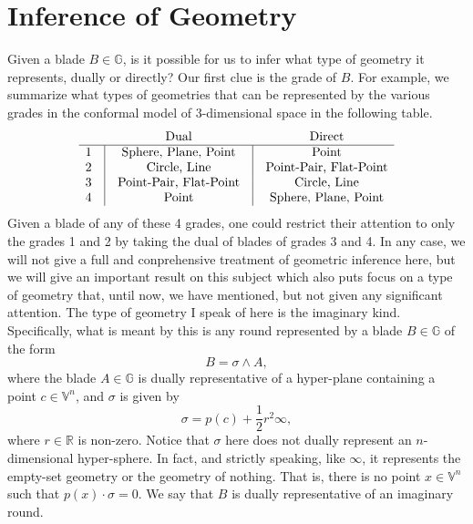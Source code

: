 \documentclass[12pt]{article}
\newcommand{\G}{\mathbb{G}}
\newcommand{\V}{\mathbb{V}}
\newcommand{\R}{\mathbb{R}}
\newcommand{\nvai}{\infty}
\begin{document}
\section{Inference of Geometry}

Given a blade $B\in\G$, is it possible for us to infer what type of geometry it
represents, dually or directly?  Our first clue is the grade of $B$.
For example, we summarize what types of geometries that can be represented by the various
grades in the conformal model of 3-dimensional space in the following table.
\begin{equation*}
\begin{array}{ccccc}
 &  & \mbox{Dual} & & \mbox{Direct} \\
\hline
1 & \vline & \mbox{Sphere, Plane, Point} & \vline & \mbox{Point} \\
2 & \vline & \mbox{Circle, Line} & \vline & \mbox{Point-Pair, Flat-Point} \\
3 & \vline & \mbox{Point-Pair, Flat-Point} & \vline & \mbox{Circle, Line} \\
4 & \vline & \mbox{Point} & \vline & \mbox{Sphere, Plane, Point}
\end{array}
\end{equation*}
Given a blade of any of these 4 grades, one could restrict their attention to
only the grades 1 and 2 by taking the dual of blades of grades 3 and 4.
In any case, we will not give a full and conprehensive treatment of
geometric inference here, but we will give an important result on this subject
which also puts focus on a type of geometry that, until now, we have
mentioned, but not given any significant attention.  
The type of geometry I speak of here is the imaginary kind.
Specifically, what is meant by this is any round represented by
a blade $B\in\G$ of the form
\begin{equation*}
B = \sigma\wedge A,
\end{equation*}
where the blade $A\in\G$ is dually representative of a hyper-plane containing
a point $c\in\V^n$, and $\sigma$ is given by
\begin{equation*}
\sigma = p(c) + \frac{1}{2}r^2\nvai,
\end{equation*}
where $r\in\R$ is non-zero.  Notice that $\sigma$ here does not dually
represent an $n$-dimensional hyper-sphere.  In fact, and strictly speaking,
like $\nvai$, it represents the empty-set geometry or the geometry of nothing.
That is, there is no point $x\in\V^n$ such that $p(x)\cdot\sigma = 0$.  We say
that $B$ is dually representative of an imaginary round.
\end{document}
